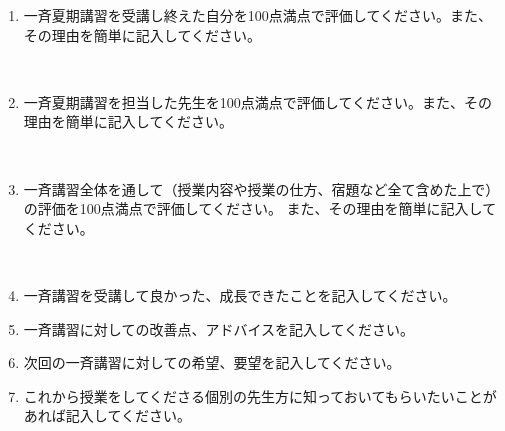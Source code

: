 \vspace{1em}
\begin{enumerate}
  \item 一斉夏期講習を受講し終えた自分を100点満点で評価してください。また、その理由を簡単に記入してください。
    \begin{center}
    \scorebox\\[1.5em]
    \sheetline[0.95\linewidth][4em]
    \end{center}

  \item 一斉夏期講習を担当した先生を100点満点で評価してください。また、その理由を簡単に記入してください。
    \begin{center}
    \scorebox\\[1.5em]
    \sheetline[0.95\linewidth][4em]
    \end{center}

  \item 一斉講習全体を通して（授業内容や授業の仕方、宿題など全て含めた上で）の評価を100点満点で評価してください。
  また、その理由を簡単に記入してください。
    \begin{center}
    \scorebox\\[1.5em]
    \sheetline[0.95\linewidth][4em]
    \end{center}

  \item 一斉講習を受講して良かった、成長できたことを記入してください。
    \begin{center}
    \sheetline[0.95\linewidth][8em]
    \end{center}

  \item 一斉講習に対しての改善点、アドバイスを記入してください。
    \begin{center}
    \sheetline[0.95\linewidth][3em]
    \end{center}

    \newpage

  \item 次回の一斉講習に対しての希望、要望を記入してください。
    \begin{center}
    \sheetline[0.95\linewidth][3em]
    \end{center}

  \item これから授業をしてくださる個別の先生方に知っておいてもらいたいことがあれば記入してください。
    \begin{center}
    \sheetline[0.95\linewidth][3em]
    \end{center}


\end{enumerate}
